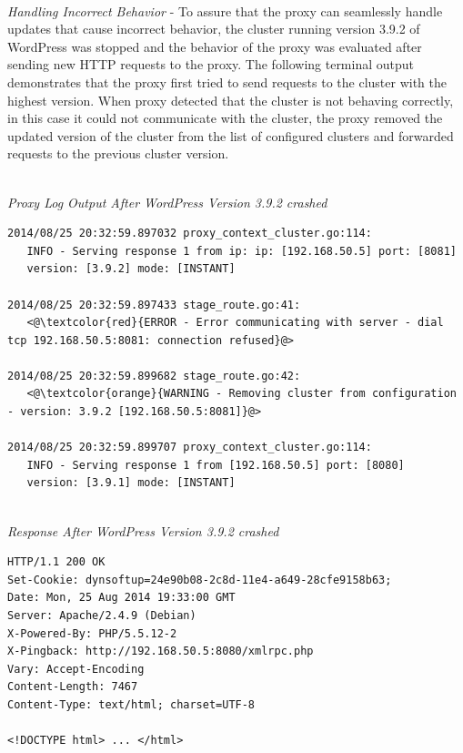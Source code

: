 \documentclass[a4paper,11pt,twoside]{report}
\begin{document}
\noindent\\
\textit{Handling Incorrect Behavior} - To assure that the proxy can seamlessly handle updates that cause incorrect behavior, the cluster running version 3.9.2 of WordPress was stopped and the behavior of the proxy was evaluated after sending new HTTP requests to the proxy. The following terminal output demonstrates that the proxy first tried to send requests to the cluster with the highest version. When proxy detected that the cluster is not behaving correctly, in this case it could not communicate with the cluster, the proxy removed the updated version of the cluster from the list of configured clusters and forwarded requests to the previous cluster version. 

\noindent\\
\textit{Proxy Log Output After WordPress Version 3.9.2 crashed}
\begin{lstlisting}[language=terminal]
2014/08/25 20:32:59.897032 proxy_context_cluster.go:114:     
   INFO - Serving response 1 from ip: ip: [192.168.50.5] port: [8081] 
   version: [3.9.2] mode: [INSTANT]
   
2014/08/25 20:32:59.897433 stage_route.go:41:    
   <@\textcolor{red}{ERROR - Error communicating with server - dial tcp 192.168.50.5:8081: connection refused}@>

2014/08/25 20:32:59.899682 stage_route.go:42:  
   <@\textcolor{orange}{WARNING - Removing cluster from configuration - version: 3.9.2 [192.168.50.5:8081]}@>

2014/08/25 20:32:59.899707 proxy_context_cluster.go:114:     
   INFO - Serving response 1 from [192.168.50.5] port: [8080] 
   version: [3.9.1] mode: [INSTANT]
\end{lstlisting}

\noindent\\
\textit{Response After WordPress Version 3.9.2 crashed}
\begin{lstlisting}[language=terminal]
HTTP/1.1 200 OK
Set-Cookie: dynsoftup=24e90b08-2c8d-11e4-a649-28cfe9158b63;
Date: Mon, 25 Aug 2014 19:33:00 GMT
Server: Apache/2.4.9 (Debian)
X-Powered-By: PHP/5.5.12-2
X-Pingback: http://192.168.50.5:8080/xmlrpc.php
Vary: Accept-Encoding
Content-Length: 7467
Content-Type: text/html; charset=UTF-8

<!DOCTYPE html> ... </html>  
\end{lstlisting}
   
\end{document}
